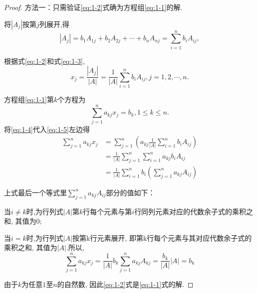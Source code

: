 \begin{proof}

  方法一：只需验证\eqref{eq:1-2}式确为方程组\eqref{eq:1-1}的解.

  将$|A_j|$按第$j$列展开,得
  \begin{equation}\label{eq:1-3}
    |A_j|=b_1A_{1j}+b_2A_{2j}+\cdots+b_nA_{nj}=\sum\limits_{i=1}^nb_iA_{ij},
  \end{equation}

  根据式\eqref{eq:1-2}和式\eqref{eq:1-3},
  \begin{equation}\label{eq:1-4}
    x_j=\frac{|A_j|}{|A|}=\frac{1}{|A|}\sum\limits_{i=1}^nb_iA_{ij},
    j=1,2,\cdots,n.
  \end{equation}

  方程组\eqref{eq:1-1}第$k$个方程为
  \begin{equation}\label{eq:1-5}
    \sum\limits_{j=1}^na_{kj}x_j=b_k, 1 \leq k \leq n.
  \end{equation}
  将\eqref{eq:1-4}代入\eqref{eq:1-5}左边得
  \begin{equation*}
    \begin{split}
    \sum\limits_{j=1}^na_{kj}x_j & =
    \sum\limits_{j=1}^n(a_{kj}\frac{1}{|A|}\sum\limits_{i=1}^nb_iA_{ij})\\
    & = \frac{1}{|A|}\sum\limits_{j=1}^n\sum\limits_{i=1}^na_{kj}b_iA_{ij}\\
    & = \frac{1}{|A|}\sum\limits_{i=1}^nb_i(\sum\limits_{j=1}^na_{kj}A_{ij})
    \end{split}
  \end{equation*}

  上式最后一个等式里$\sum\limits_{j=1}^na_{kj}A_{ij}$部分的值如下：

  当$i \neq k$时,为行列式$|A|$第$k$行每个元素与第$i$行同列元素对应的代数余子式的乘积之和,
  其值为0;

  当$i = k$时,为行列式$|A|$按第k行元素展开,
  即第k行每个元素与其对应代数余子式的乘积之和,
  其值为$|A|$.所以,
  \begin{equation*}
    \sum\limits_{j=1}^na_{kj}x_j
    = \frac{1}{|A|}b_k\sum\limits_{j=1}^na_{kj}A_{kj}
    = \frac{b_k}{|A|}|A|
    = b_k
  \end{equation*}

  由于$k$为任意$1$至$n$的自然数,
  因此\eqref{eq:1-2}式是\eqref{eq:1-1}式的解.


\end{proof}
